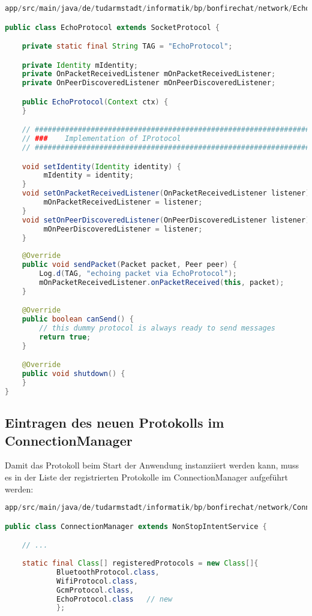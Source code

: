 \begin{lstlisting}[language=Java]
app/src/main/java/de/tudarmstadt/informatik/bp/bonfirechat/network/EchoProtocol.java

public class EchoProtocol extends SocketProtocol {

    private static final String TAG = "EchoProtocol";

    private Identity mIdentity;
    private OnPacketReceivedListener mOnPacketReceivedListener;
    private OnPeerDiscoveredListener mOnPeerDiscoveredListener;

    public EchoProtocol(Context ctx) {
    }

    // ###########################################################################
    // ###    Implementation of IProtocol
    // ###########################################################################

    void setIdentity(Identity identity) {
         mIdentity = identity;
    }
    void setOnPacketReceivedListener(OnPacketReceivedListener listener) {
         mOnPacketReceivedListener = listener;
    }
    void setOnPeerDiscoveredListener(OnPeerDiscoveredListener listener) {
         mOnPeerDiscoveredListener = listener;
    }
    
    @Override
    public void sendPacket(Packet packet, Peer peer) {
        Log.d(TAG, "echoing packet via EchoProtocol");
        mOnPacketReceivedListener.onPacketReceived(this, packet);
    }

    @Override
    public boolean canSend() {
        // this dummy protocol is always ready to send messages
        return true;
    }

    @Override
    public void shutdown() {
    }
}

\end{lstlisting}


\subsection{Eintragen des neuen Protokolls im ConnectionManager}

Damit das Protokoll beim Start der Anwendung instanziiert werden kann, muss es in der Liste der registrierten Protokolle im ConnectionManager aufgeführt werden:
\begin{lstlisting}[language=Java]
app/src/main/java/de/tudarmstadt/informatik/bp/bonfirechat/network/ConnectionManager.java

public class ConnectionManager extends NonStopIntentService {

    // ...
    
    static final Class[] registeredProtocols = new Class[]{
            BluetoothProtocol.class,
            WifiProtocol.class,
            GcmProtocol.class,
            EchoProtocol.class   // new
            };

\end{lstlisting}


